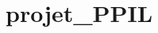 \chapter{projet\+\_\+\+PPIL}
\hypertarget{md__r_e_a_d_m_e}{}\label{md__r_e_a_d_m_e}
\label{md__r_e_a_d_m_e_autotoc_md0}%
%
